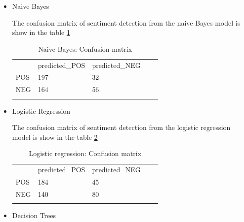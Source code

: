 \begin{itemize}
    \item  Naive Bayes
    
    The confusion matrix of sentiment detection from the naive Bayes model is show in the table \ref{tab:confusionmatrix_sentimentmigrationtweets_NB}
    
    \begin{table}[]
\centering
\begin{tabular}{lllll}
\cline{1-3}
\multicolumn{1}{|l|}{}   & \multicolumn{1}{l|}{predicted\_POS} & \multicolumn{1}{l|}{predicted\_NEG}  &  &  \\ \cline{1-3}
\multicolumn{1}{|l|}{POS} & \multicolumn{1}{l|}{197}  & \multicolumn{1}{l|}{32} &  &  \\ \cline{1-3}
\multicolumn{1}{|l|}{NEG}   & \multicolumn{1}{l|}{164}  & \multicolumn{1}{l|}{56}  &  &  \\ \cline{1-3}
                            &                           &                           &  & 
\end{tabular}
\caption{Naive Bayes: Confusion matrix}
\label{tab:confusionmatrix_sentimentmigrationtweets_NB}
\end{table}

\item  Logistic Regression
    
    The confusion matrix of sentiment detection from the logistic regression model is show in the table \ref{tab:confusionmatrix_sentimentmigrationtweets_LR}
    
    \begin{table}[]
\centering
\begin{tabular}{lllll}
\cline{1-3}
\multicolumn{1}{|l|}{}   & \multicolumn{1}{l|}{predicted\_POS} & \multicolumn{1}{l|}{predicted\_NEG}  &  &  \\ \cline{1-3}
\multicolumn{1}{|l|}{POS} & \multicolumn{1}{l|}{184}  & \multicolumn{1}{l|}{45} &  &  \\ \cline{1-3}
\multicolumn{1}{|l|}{NEG}   & \multicolumn{1}{l|}{140}  & \multicolumn{1}{l|}{80}  &  &  \\ \cline{1-3}
                            &                           &                           &  & 
\end{tabular}
\caption{Logistic regression: Confusion matrix}
\label{tab:confusionmatrix_sentimentmigrationtweets_LR}
\end{table}

\item  Decision Trees
    

\end{itemize}
